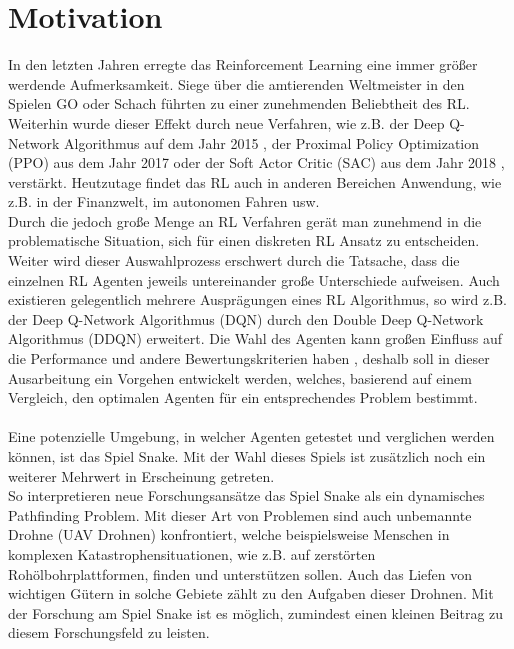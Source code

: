 \section{Motivation} \label{sec:Einleitung_Motivation}
In den letzten Jahren erregte das Reinforcement Learning eine immer größer werdende Aufmerksamkeit. Siege über die amtierenden Weltmeister in den Spielen GO oder Schach führten zu einer zunehmenden Beliebtheit des RL. Weiterhin wurde dieser Effekt durch neue Verfahren, wie z.B. der Deep Q-Network Algorithmus auf dem Jahr 2015 \citep{DQN}, der Proximal Policy Optimization (PPO) aus dem Jahr 2017 \citep{PPO} oder der Soft Actor Critic (SAC) aus dem Jahr 2018 \citep{SAC}, verstärkt. Heutzutage findet das RL auch in anderen Bereichen Anwendung, wie z.B. in der Finanzwelt, im autonomen Fahren usw.\\
Durch die jedoch große Menge an RL Verfahren gerät man zunehmend in die problematische Situation, sich für einen diskreten RL Ansatz zu entscheiden. Weiter wird dieser Auswahlprozess erschwert durch die Tatsache, dass die einzelnen RL Agenten jeweils untereinander große Unterschiede aufweisen. Auch existieren gelegentlich mehrere Ausprägungen eines RL Algorithmus, so wird z.B. der Deep Q-Network Algorithmus (DQN) durch den Double Deep Q-Network Algorithmus (DDQN) erweitert. Die Wahl des Agenten kann großen Einfluss auf die Performance und andere Bewertungskriterien haben \cite{Exploration_of_Reinforcement_Learning_to_SNAKE}, deshalb soll in dieser Ausarbeitung ein Vorgehen entwickelt werden, welches, basierend auf einem Vergleich, den optimalen Agenten für ein entsprechendes Problem bestimmt.\\
\\Eine potenzielle Umgebung, in welcher Agenten getestet und verglichen werden können, ist das Spiel Snake.
Mit der Wahl dieses Spiels ist zusätzlich noch ein weiterer Mehrwert in Erscheinung getreten.\\ 
So interpretieren neue Forschungsansätze das Spiel Snake als ein dynamisches Pathfinding Problem. Mit dieser Art von Problemen sind auch unbemannte Drohne (UAV Drohnen) konfrontiert, welche beispielsweise Menschen in komplexen Katastrophensituationen, wie z.B. auf zerstörten Rohölbohrplattformen, finden und unterstützen sollen. 
Auch das Liefen von wichtigen Gütern in solche Gebiete zählt zu den Aufgaben dieser Drohnen.
Mit der Forschung am Spiel Snake ist es möglich, zumindest einen kleinen Beitrag zu diesem Forschungsfeld zu leisten. \citep{UAV}

